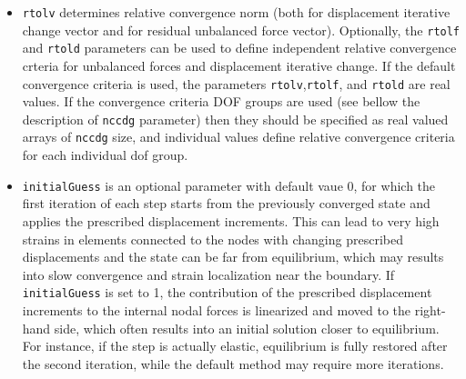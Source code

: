 \documentclass[a4paper]{report}
\newcommand{\param}[1]{\texttt{#1}} %
\begin{document}
\begin{itemize}
\item \param{rtolv} determines relative convergence norm (both for displacement
iterative change vector and for residual unbalanced force vector). Optionally, the \param{rtolf} and \param{rtold} parameters can be used to define
independent relative convergence crteria for unbalanced forces and displacement
iterative change. If the default convergence criteria is used,
the parameters \param{rtolv},\param{rtolf}, and \param{rtold} are real values. If the convergence criteria DOF groups are used (see bellow the description of \param{nccdg} parameter) then they should be specified as real valued arrays of \param{nccdg} size, and individual values define relative convergence criteria for each individual dof group.
\item \param{initialGuess} is an optional parameter with default vaue 0, for which the first iteration of each step starts from the previously converged state and applies the prescribed displacement increments. This can lead to very high strains in elements connected to the nodes with changing prescribed displacements and the state can be far from equilibrium, which may results into slow convergence and strain localization near the boundary. If \param{initialGuess} is set to 1, the contribution of the prescribed displacement increments to the internal nodal forces is linearized and moved to the right-hand side, which often results into an initial solution closer to equilibrium. For instance, if the step is actually elastic, equilibrium is fully restored after the second iteration, while the default method may require more iterations.  
\end{itemize}
\end{document}
